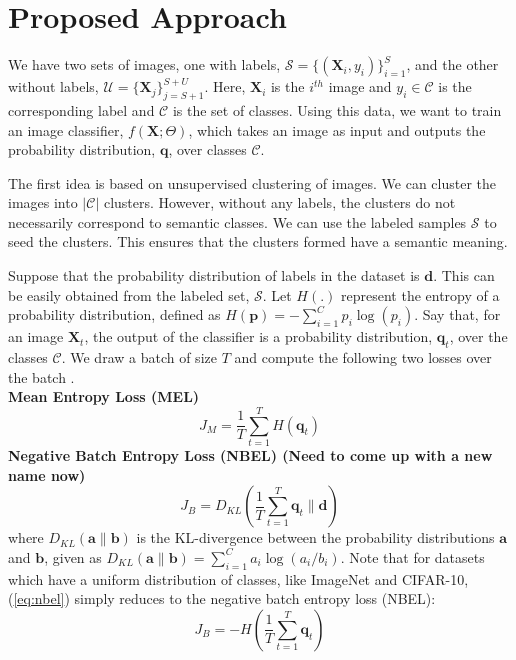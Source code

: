 \section{Proposed Approach}

We have two sets of images, one with labels, $\mathcal{S} = \{(\mathbf{X}_i, y_i)\}_{i=1}^S$, and 
the other without labels, $\mathcal{U} = \{\mathbf{X}_j\}_{j=S+1}^{S+U}$. Here, $\mathbf{X}_i$ is the
$i^{th}$ image and $y_i \in \mathcal{C}$ is the corresponding label and $\mathcal{C}$ is the set of
classes.  Using this data, we want to train an image classifier, $f(\mathbf{X}; \Theta)$,
which takes an image as input and outputs the probability distribution, $\mathbf{q}$, over classes
$\mathcal{C}$.

The first idea is based on unsupervised clustering of images. We can cluster the images into
$|\mathcal{C}|$ clusters. However, without any labels, the clusters do not necessarily
correspond to semantic classes. We can use the labeled samples $\mathcal{S}$ to seed the clusters.
This ensures that the clusters formed have a semantic meaning.

Suppose that the probability distribution of labels in the dataset is $\mathbf{d}$. This can be
easily obtained from the labeled set, $\mathcal{S}$.  Let $H(.)$ represent the entropy of a
probability distribution, defined as $H(\mathbf{p}) = -\sum_{i=1}^{C}p_i \log(p_i)$.  Say that, for
an image $\mathbf{X}_t$, the output of the classifier is a probability distribution, $\mathbf{q}_t$,
over the classes $\mathcal{C}$. We draw a batch of size $T$ and compute the following two losses
over the batch \cite{subic}.\\
\newline
\textbf{Mean Entropy Loss (MEL)}
\begin{equation}
	J_M = \frac{1}{T}\sum_{t=1}^{T}H(\mathbf{q}_t)
\end{equation}
\textbf{Negative Batch Entropy Loss (NBEL) (Need to come up with a new name now)}
\begin{equation}
	\label{eq:nbel}
	J_B = D_{KL} (\frac{1}{T}\sum_{t=1}^{T}\mathbf{q}_t \lVert \mathbf{d})
\end{equation}
where $D_{KL}(\mathbf{a} \lVert	\mathbf{b})$ is the KL-divergence between the probability
distributions $\mathbf{a}$ and $\mathbf{b}$, given as $D_{KL}(\mathbf{a} \lVert \mathbf{b}) =
\sum_{i=1}^{C}a_i \log(a_i / b_i)$. Note that for datasets which have a uniform distribution of
classes, like ImageNet and CIFAR-10, (\ref{eq:nbel}) simply reduces to the negative batch
entropy loss (NBEL):
\begin{equation}
	J_B = -H(\frac{1}{T}\sum_{t=1}^{T}\mathbf{q}_t)
\end{equation}

